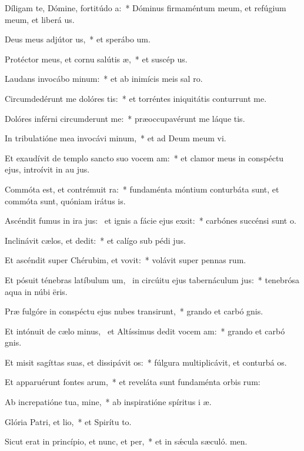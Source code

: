 \item Díligam te, Dómine, fortitúdo a:~* Dóminus firmaméntum meum, et refúgium meum, et liberá us.
\item Deus meus adjútor us,~* et sperábo  um.
\item Protéctor meus, et cornu salútis æ,~* et suscép us.
\item Laudans invocábo minum:~* et ab inimícis meis sal ro.
\item Circumdedérunt me dolóres tis:~* et torréntes iniquitátis conturrunt me.
\item Dolóres inférni circumderunt me:~* præoccupavérunt me láque tis.
\item In tribulatióne mea invocávi minum,~* et ad Deum meum vi.
\item Et exaudívit de templo sancto suo vocem am:~* et clamor meus in conspéctu ejus, introívit in au jus.
\item Commóta est, et contrémuit ra:~* fundaménta móntium conturbáta sunt, et commóta sunt, quóniam irátus  is.
\item Ascéndit fumus in ira jus:~\pscross{} et ignis a fácie ejus exsit:~* carbónes succénsi sunt  o.
\item Inclinávit cælos, et dedit:~* et calígo sub pédi jus.
\item Et ascéndit super Chérubim, et vovit:~* volávit super pennas rum.
\item Et pósuit ténebras latíbulum um,~\pscross{} in circúitu ejus tabernáculum jus:~* tenebrósa aqua in núbi ëris.
\item Præ fulgóre in conspéctu ejus nubes transirunt,~* grando et carbó gnis.
\item Et intónuit de cælo minus,~\pscross{} et Altíssimus dedit vocem am:~* grando et carbó gnis.
\item Et misit sagíttas suas, et dissipávit os:~* fúlgura multiplicávit, et conturbá os.
\item Et apparuérunt fontes arum,~* et reveláta sunt fundaménta orbis rum:
\item Ab increpatióne tua, mine,~* ab inspiratióne spíritus i æ.
\item Glória Patri, et lio,~* et Spirítu to.
\item Sicut erat in princípio, et nunc, et per,~* et in sǽcula sæculó. men.
